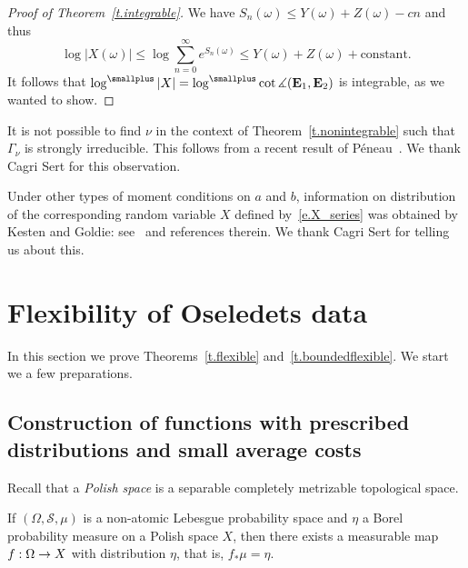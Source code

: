 \documentclass[AHL,Unicode,longabstracts,published]{cedram}
\newcommand{\E}{\mathbf{E}}
\newcommand{\clS}{\mathcal{S}}
\renewcommand{\angle}{\measuredangle}
\renewcommand*{\to}{\mathchoice{\longrightarrow}{\rightarrow}{\rightarrow}{\rightarrow}}
\begin{document}
\begin{proof}[Proof of Theorem~\ref{t.integrable}]
We have $S_n(\omega) \le Y(\omega) + Z(\omega) -cn$ and thus
\begin{equation}
\log |X (\omega)| \le \log \sum_{n=0}^\infty e^{S_n(\omega)} \le Y(\omega) + Z(\omega) + \text{constant}.
\end{equation}
It follows that $\log^{\smallplus} |X| = \log^{\smallplus} \cot \angle(\E_1, \E_2)$ is integrable, as we wanted to show.
\end{proof}

\begin{rema}
It is not possible to find $\nu$ in the context of Theorem~\ref{t.nonintegrable} such that $\Gamma_\nu$ is strongly irreducible. This follows from a recent result of Péneau~\cite[Corollary~1.14]{Peneau}. We thank Cagri Sert for this observation.
\end{rema}

\begin{rema}
Under other types of moment conditions on $a$ and $b$, information on distribution of the corresponding random variable $X$ defined by~\eqref{e.X_series} was obtained by Kesten and Goldie: see~\cite{BDZ} and references therein. We thank Cagri Sert for telling us about this.
\end{rema}



\section{Flexibility of Oseledets data}\label{s.general}

In this section we prove Theorems~\ref{t.flexible} and~\ref{t.boundedflexible}. We start we a few preparations.

\subsection{Construction of functions with prescribed distributions and small average costs}

Recall that a \emph{Polish space} is a separable completely metrizable topological space.


\begin{lemm}\label{l.basic}
If $(\Omega,\clS,\mu)$ is a non-atomic Lebesgue probability space and $\eta$ a Borel probability measure on a Polish space $X$, then there exists a measurable map $f:\Omega \to X$ with distribution $\eta$, that is, $f_*\mu= \eta$.
\end{lemm}
\end{document}
